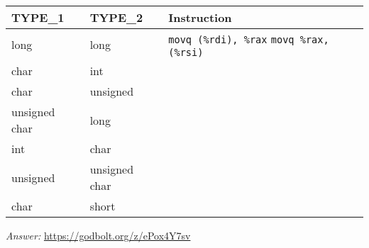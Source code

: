 \begin{table}[h]
    \centering
    \small
    \renewcommand{\arraystretch}{1.4} %
    \begin{tabular}{l l p{5cm}} %
        \toprule
        \textbf{TYPE\_1} & \textbf{TYPE\_2} & \textbf{Instruction} \\
        \midrule
        long & long & \texttt{movq (\%rdi), \%rax} \newline \texttt{movq \%rax, (\%rsi)} \\
        char & int & \underline{\hspace{5cm}} \newline \underline{\hspace{5cm}} \\
        char & unsigned & \underline{\hspace{5cm}} \newline \underline{\hspace{5cm}} \\
        unsigned char & long & \underline{\hspace{5cm}} \newline \underline{\hspace{5cm}} \\
        int & char & \underline{\hspace{5cm}} \newline \underline{\hspace{5cm}} \\
        unsigned & unsigned char & \underline{\hspace{5cm}} \newline \underline{\hspace{5cm}} \\
        char & short & \underline{\hspace{5cm}} \newline \underline{\hspace{5cm}} \\
        \bottomrule
    \end{tabular}
\end{table}
\textit{Answer:} \url{https://godbolt.org/z/ePox4Y7sv}
\clearpage
%
